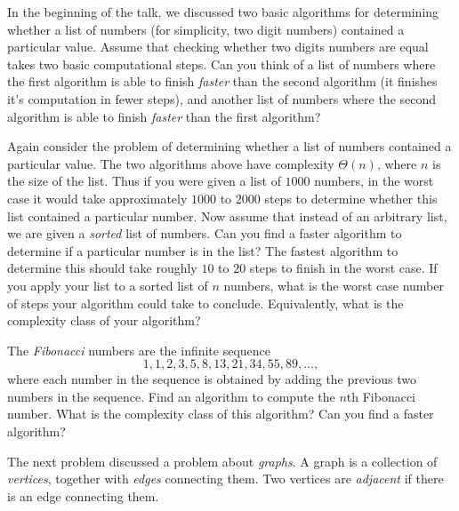 \documentclass[answers]{exam}
\begin{document}
\begin{questions}

\question In the beginning of the talk, we discussed two basic algorithms for determining whether a list of numbers (for simplicity, two digit numbers) contained a particular value. Assume that checking whether two digits numbers are equal takes two basic computational steps. Can you think of a list of numbers where the first algorithm is able to finish \emph{faster} than the second algorithm (it finishes it's computation in fewer steps), and another list of numbers where the second algorithm is able to finish \emph{faster} than the first algorithm?

\question Again consider the problem of determining whether a list of numbers contained a particular value. The two algorithms above have complexity $\Theta(n)$, where $n$ is the size of the list. Thus if you were given a list of $1000$ numbers, in the worst case it would take approximately $1000$ to $2000$ steps to determine whether this list contained a particular number. Now assume that instead of an arbitrary list, we are given a \emph{sorted} list of numbers. Can you find a faster algorithm to determine if a particular number is in the list? The fastest algorithm to determine this should take roughly $10$ to $20$ steps to finish in the worst case. If you apply your list to a sorted list of $n$ numbers, what is the worst case number of steps your algorithm could take to conclude. Equivalently, what is the complexity class of your algorithm? 

\question The \emph{Fibonacci} numbers are the infinite sequence
%
\[ 1,1,2,3,5,8,13,21,34,55,89,\dots, \]
%
where each number in the sequence is obtained by adding the previous two numbers in the sequence. Find an algorithm to compute the $n$th Fibonacci number. What is the complexity class of this algorithm? Can you find a faster algorithm?

\question The next problem discussed a problem about \emph{graphs}. A graph is a collection of \emph{vertices}, together with \emph{edges} connecting them. Two vertices are \emph{adjacent} if there is an edge connecting them.

\begin{center}
\end{center}


\end{questions}
\end{document}

